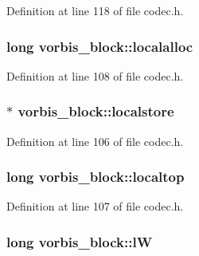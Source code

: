 Definition at line 118 of file codec.\+h.

\subsubsection[{\texorpdfstring{localalloc}{localalloc}}]{\setlength{\rightskip}{0pt plus 5cm}long vorbis\+\_\+block\+::localalloc}\hypertarget{structvorbis__block_a0bf878ef26f578abfd5c7974d8a09f7d}{}\label{structvorbis__block_a0bf878ef26f578abfd5c7974d8a09f7d}


Definition at line 108 of file codec.\+h.

\subsubsection[{\texorpdfstring{localstore}{localstore}}]{$\ast$ vorbis\+\_\+block\+::localstore}\hypertarget{structvorbis__block_a457093b574de4317ae1b2505a868a5fb}{}\label{structvorbis__block_a457093b574de4317ae1b2505a868a5fb}


Definition at line 106 of file codec.\+h.

\subsubsection[{\texorpdfstring{localtop}{localtop}}]{\setlength{\rightskip}{0pt plus 5cm}long vorbis\+\_\+block\+::localtop}\hypertarget{structvorbis__block_a5d207139360d9fa6c825ebca553ae984}{}\label{structvorbis__block_a5d207139360d9fa6c825ebca553ae984}


Definition at line 107 of file codec.\+h.

\subsubsection[{\texorpdfstring{lW}{lW}}]{\setlength{\rightskip}{0pt plus 5cm}long vorbis\+\_\+block\+::lW}\hypertarget{structvorbis__block_a97675088561ed9aa4559e869aafd1f2c}{}\label{structvorbis__block_a97675088561ed9aa4559e869aafd1f2c}


